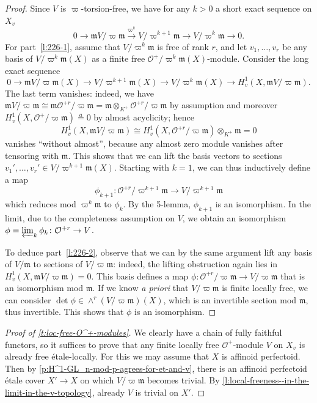 \documentclass[11pt]{amsart}
\numberwithin{equation}{section}
\theoremstyle{definition}
\theoremstyle{remark}
\newcommand{\lra}{\longrightarrow}
\renewcommand{\O}{\mathcal{O}}
\newcommand{\m}{\mathfrak{m}}
\newcommand{\aeq}{\stackrel{a}{=}}
\begin{document}
\begin{proof}
	Since $V$ is $\varpi$-torsion-free, we have for any $k>0$ a short exact sequence on $X_v$
	\[ 0\lra \m V/\varpi\mathfrak m\xrightarrow{\varpi^k} V/\varpi^{k+1}\mathfrak m\lra V/\varpi^k\m\lra 0.\]
	For part~\eqref{l:226-1}, assume that $V/\varpi^k\m$ is free of rank $r$, and let $v_1,\dots,v_r$ be any basis of $V/\varpi^k\m(X)$ as a finite free $\O^{+}/\varpi^k\m(X)$-module. Consider the long exact sequence
	\[ 0\lra \m V/\varpi \m(X)\lra V/\varpi^{k+1}\m(X)\lra V/\varpi^k\m(X)\lra H^1_v(X,\m V/\varpi\m).\]
	The last term vanishes: indeed, we have $\m V/\varpi\m\cong \m \O^{+r}/\varpi\m= \m \otimes_{K^+}\O^{+r}/\varpi\m$ by assumption and moreover $H^1_v(X,\O^+/\varpi\m)\aeq 0$ by almost acyclicity; hence
	\[ H^1_v(X,\m V/\varpi\m)\cong H^1_v(X,\O^{+r}/\varpi\m)\otimes_{K^+} \m=0\]
	vanishes ``without almost'', because any almost zero module vanishes after tensoring with $\mathfrak m$.
	This shows that we can lift the basis vectors to sections  $v_1',\dots,v_r'\in V/\varpi^{k+1}\m(X)$. Starting with $k=1$, we can thus inductively define  a map
	\[ \phi_{k+1}\colon \O^{+r}/\varpi^{k+1}\m\lra V/\varpi^{k+1}\m\]
	which reduces mod $\varpi^k\m$ to $\phi_k$. By the 5-lemma, $\phi_{k+1}$ is an isomorphism. In the limit, due to the completeness assumption on $V$, we obtain an isomorphism
	$\phi=\varprojlim_k\phi_k\colon \O^{+r}\to V$.
	
	To deduce part~\eqref{l:226-2}, observe that we can by the same argument lift any basis of $V/\m$ to sections of $V/\varpi \m$: indeed, the lifting obstruction again lies in $H^1_v(X,\m V/\varpi\m)=0$. This basis defines a map $\phi\colon \O^{+r}/\varpi\m\to V/\varpi\m$ that is an isomorphism mod $\m$. If we know \textit{a priori} that $V/\varpi\m$ is finite locally free, we can consider $\det \phi\in \wedge^r(V/\varpi\m)(X)$, which is an invertible  section mod $\m$, thus invertible. This shows that $\phi$ is an isomorphism.
\end{proof}

\begin{proof}[Proof of \cref{t:loc-free-O^+-modules}]
	We clearly have a chain of fully faithful functors, so it suffices to prove that any finite locally free $\O^+$-module $V$ on $X_{v}$ is already free \'etale-locally. For this we may assume that $X$ is affinoid perfectoid. Then by \cref{p:H^1-GL_n-mod-p-agrees-for-et-and-v}, there is an affinoid perfectoid \'etale cover $X'\to X$ on which $V/\varpi\m$ becomes trivial. By \cref{l:local-freeness--in-the-limit-in-the-v-topology}, already $V$ is trivial on $X'$.
\end{proof}
\end{document}
